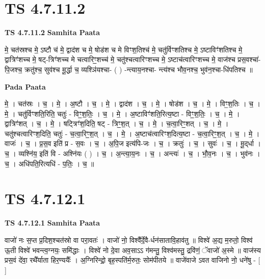 \documentclass[17pt]{extarticle}
\begin{document}
\section*{ TS 4.7.11.2 }

\textbf{TS 4.7.11.2 } \newline
\textbf{Samhita Paata} \newline

मे॒ चत॑स्रश्च मे॒ ऽष्टौ च॑ मे॒ द्वाद॑श च मे॒ षोड॑श च मे विꣳश॒तिश्च॑ मे॒ चतु॑र्विꣳशतिश्च मे॒ ऽष्टाविꣳ॑शतिश्च मे॒ द्वात्रिꣳ॑शच्च मे॒ षट्-त्रिꣳ॑शच्च मे चत्वारिꣳ॒॒शच्च॑ मे॒ चतु॑श्चत्वारिꣳशच्च मे॒ ऽष्टाच॑त्वारिꣳशच्च मे॒ वाज॑श्च प्रस॒वश्चा॑-पि॒जश्च॒ क्रतु॑श्च॒ सुव॑श्च मू॒र्द्धा च॒ व्यश्ञि॑यश्चा- ( ) -न्त्याय॒नश्चा- न्त्य॑श्च भौव॒नश्च॒ भुव॑न॒श्चा-धि॑पतिश्च ॥ \newline

\textbf{Pada Paata} \newline

मे॒ । चत॑स्रः । च॒ । मे॒ । अ॒ष्टौ । च॒ । मे॒ । द्वाद॑श । च॒ । मे॒ । षोड॑श । च॒ । मे॒ । विꣳ॒श॒तिः । च॒ । मे॒ । चतु॑र्विꣳशति॒रिति॒ चतुः॑ - विꣳ॒॒श॒तिः॒ । च॒ । मे॒ । अ॒ष्टाविꣳ॑शति॒रित्य॒ष्टा - विꣳ॒॒श॒तिः॒ । च॒ । मे॒ । द्वात्रिꣳ॑शत् । च॒ । मे॒ । षट्त्रिꣳ॑श॒दिति॒ षट् - त्रिꣳ॒॒श॒त् । च॒ । मे॒ । च॒त्वा॒रिꣳ॒॒शत् । च॒ । मे॒ । चतु॑श्चत्वारिꣳश॒दिति॒ चतुः॑ - च॒त्वा॒रिꣳ॒॒श॒त् । च॒ । मे॒ । अ॒ष्टाच॑त्वारिꣳश॒दित्य॒ष्टा - च॒त्वा॒रिꣳ॒॒श॒त् । च॒ । मे॒ । वाजः॑ । च॒ । प्र॒स॒व इति॑ प्र - स॒वः । च॒ । अ॒पि॒ज इत्य॑पि-जः । च॒ । क्रतुः॑ । च॒ । सुवः॑ । च॒ । मू॒द्‌र्धा । च॒ । व्यश्नि॑य॒ इति॑ वि - अश्नि॑यः ( ) । च॒ । अ॒न्त्या॒य॒नः । च॒ । अन्त्यः॑ । च॒ । भौ॒व॒नः । च॒ । भुव॑नः । च॒ । अधि॑पति॒रित्यधि॑ - प॒तिः॒ । च॒ ॥  \newline




\section*{ TS 4.7.12.1 }

\textbf{TS 4.7.12.1 } \newline
\textbf{Samhita Paata} \newline

वाजो॑ नः स॒प्त प्र॒दिश॒श्चत॑स्रो वा परा॒वतः॑ । वाजो॑ नो॒ विश्वै᳚र्दे॒वै-र्धन॑सातावि॒हाव॑तु ॥ विश्वे॑ अ॒द्य म॒रुतो॒ विश्व॑ ऊ॒ती विश्वे॑ भवन्त्व॒ग्नयः॒ समि॑द्धाः । विश्वे॑ नो दे॒वा अव॒साऽऽ ग॑मन्तु॒ विश्व॑मस्तु॒ द्रवि॑णं॒ ॅवाजो॑ अ॒स्मे ॥ वाज॑स्य प्रस॒वं दे॑वा॒ रथै᳚र्याता हिर॒ण्ययैः᳚ । अ॒ग्निरिन्द्रो॒ बृह॒स्पति॑र्म॒रुतः॒ सोम॑पीतये ॥ वाजे॑वाजे ऽवत वाजिनो नो॒ धने॑षु - [  ] \newline
\end{document}
